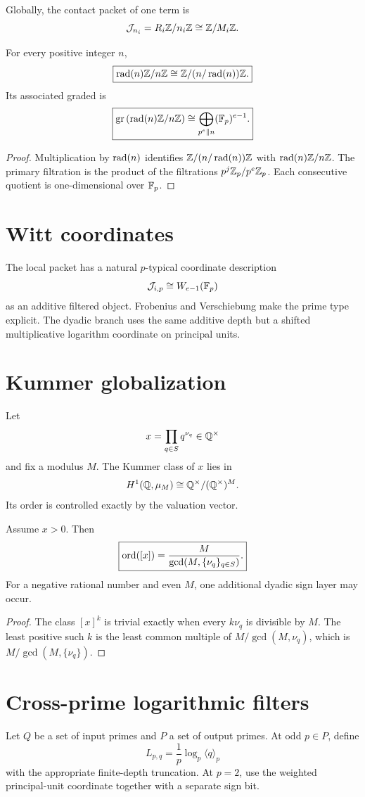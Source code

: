 Globally, the contact packet of one term is
\[
\mathcal J_{n_i}
=
R_i\mathbb Z/n_i\mathbb Z
\cong
\mathbb Z/M_i\mathbb Z.
\]

\begin{theorem}
For every positive integer $n$,
\[
\boxed{
\operatorname{rad}(n)\mathbb Z/n\mathbb Z
\cong
\mathbb Z/(n/\operatorname{rad}(n))\mathbb Z.
}
\]
Its associated graded is
\[
\boxed{
\operatorname{gr}\left(\operatorname{rad}(n)\mathbb Z/n\mathbb Z\right)
\cong
\bigoplus_{p^e\parallel n}(\mathbb F_p)^{e-1}.
}
\]
\end{theorem}

\begin{proof}
Multiplication by $\operatorname{rad}(n)$ identifies $\mathbb Z/(n/\operatorname{rad}(n))\mathbb Z$ with $\operatorname{rad}(n)\mathbb Z/n\mathbb Z$. The primary filtration is the product of the filtrations $p^j\mathbb Z_p/p^e\mathbb Z_p$. Each consecutive quotient is one-dimensional over $\mathbb F_p$.
\end{proof}

\section{Witt coordinates}
The local packet has a natural $p$-typical coordinate description
\[
\mathcal J_{i,p}
\cong
W_{e-1}(\mathbb F_p)
\]
as an additive filtered object. Frobenius and Verschiebung make the prime type explicit. The dyadic branch uses the same additive depth but a shifted multiplicative logarithm coordinate on principal units.

\section{Kummer globalization}
Let
\[
x=\prod_{q\in S}q^{\nu_q}\in\mathbb Q^\times
\]
and fix a modulus $M$. The Kummer class of $x$ lies in
\[
H^1(\mathbb Q,\mu_M)
\cong
\mathbb Q^\times/(\mathbb Q^\times)^M.
\]
Its order is controlled exactly by the valuation vector.

\begin{theorem}
Assume $x>0$. Then
\[
\boxed{
\operatorname{ord}([x])
=
\frac{M}{\gcd(M,\{\nu_q\}_{q\in S})}.
}
\]
For a negative rational number and even $M$, one additional dyadic sign layer may occur.
\end{theorem}

\begin{proof}
The class $[x]^k$ is trivial exactly when every $k\nu_q$ is divisible by $M$. The least positive such $k$ is the least common multiple of $M/\gcd(M,\nu_q)$, which is $M/\gcd(M,\{\nu_q\})$.
\end{proof}

\section{Cross-prime logarithmic filters}
Let $Q$ be a set of input primes and $P$ a set of output primes. At odd $p\in P$, define
\[
L_{p,q}
=
\frac1p\log_p\langle q\rangle_p
\]
with the appropriate finite-depth truncation. At $p=2$, use the weighted principal-unit coordinate together with a separate sign bit.


